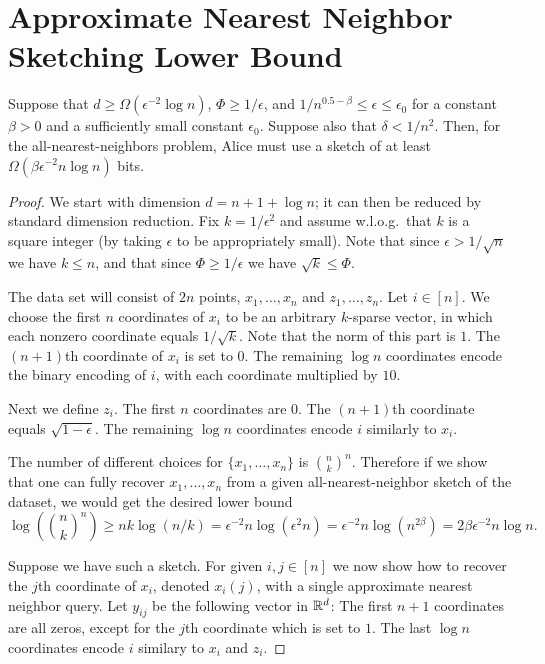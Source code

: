 \section{Approximate Nearest Neighbor Sketching Lower Bound}\label{sec:nnlower}

\begin{theorem}\label{thm:ann_lb}
Suppose that $d\geq\Omega(\epsilon^{-2}\log n)$, $\Phi\geq1/\epsilon$, and $1/n^{0.5-\beta}\leq\epsilon\leq\epsilon_0$ for a constant $\beta>0$ and a sufficiently small constant $\epsilon_0$.
Suppose also that $\delta<1/n^2$.
Then, for the all-nearest-neighbors problem, Alice must use a sketch of at least $\Omega(\beta\epsilon^{-2}n\log n)$ bits.
\end{theorem}
\begin{proof}
We start with dimension $d=n+1+\log n$; it can then be reduced by standard dimension reduction.
Fix $k=1/\epsilon^2$ and assume w.l.o.g.~that $k$ is a square integer (by taking $\epsilon$ to be appropriately small). Note that since $\epsilon>1/\sqrt{n}$ we have $k\leq n$, and that since $\Phi\geq1/\epsilon$ we have $\sqrt{k}\leq\Phi$. 

The data set will consist of $2n$ points, $x_1,\ldots,x_n$ and $z_1,\ldots,z_n$.
Let $i\in[n]$. We choose the first $n$ coordinates of $x_i$ to be an arbitrary $k$-sparse vector, in which each nonzero coordinate equals $1/\sqrt{k}$. Note that the norm of this part is $1$. The $(n+1)$th coordinate of $x_i$ is set to $0$. The remaining $\log n$ coordinates encode the binary encoding of $i$, with each coordinate multiplied by $10$.

Next we define $z_i$. The first $n$ coordinates are $0$. The $(n+1)$th coordinate equals $\sqrt{1-\epsilon}$. The remaining $\log n$ coordinates encode $i$ similarly to $x_i$.

The number of different choices for $\{x_1,\ldots,x_n\}$ is ${n\choose k}^n$.
Therefore if we show that one can fully recover $x_1,\ldots,x_n$ from a given all-nearest-neighbor sketch of the dataset, we would get the desired lower bound
\[
  \log\left({n\choose k}^n\right) \geq
   nk\log(n/k) = \epsilon^{-2}n\log(\epsilon^2n) =\epsilon^{-2}n\log(n^{2\beta}) = 2\beta\epsilon^{-2}n\log n .
\]

Suppose we have such a sketch.
For given $i,j\in[n]$ we now show how to recover the $j$th coordinate of $x_i$, denoted $x_i(j)$, with a single approximate nearest neighbor query.
Let $y_{ij}$ be the following vector in $\mathbb R^d$: The first $n+1$ coordinates are all zeros, except for the $j$th coordinate which is set to $1$. The last $\log n$ coordinates encode $i$ similary to $x_i$ and $z_i$.


\end{proof}
